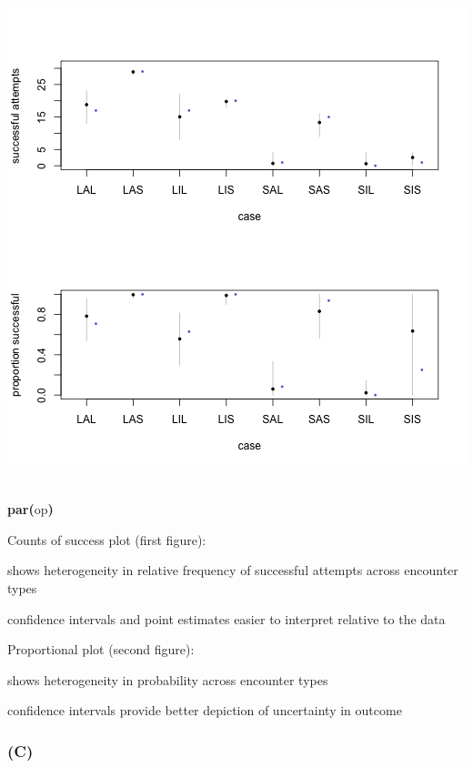 \documentclass{article}
\makeatletter
\newcommand{\hlfunctioncall}[1]{\textcolor[rgb]{.5,0,.33}{\textbf{#1}}}%
\newcommand{\hlkeyword}[1]{\textbf{#1}}%
\newcommand{\hlsymbol}[1]{#1}%
\newcommand{\hlstd}[1]{\textcolor[rgb]{0,0,0}{#1}}%
\newenvironment{kframe}{%
 \def\FrameCommand##1{\hskip\@totalleftmargin \hskip-\fboxsep
 \colorbox{shadecolor}{##1}\hskip-\fboxsep
     \hskip-\linewidth \hskip-\@totalleftmargin \hskip\columnwidth}%
 \MakeFramed {\advance\hsize-\width
   \@totalleftmargin\z@ \linewidth\hsize
   \@setminipage}}%
 {\par\unskip\endMakeFramed}
\newenvironment{knitrout}{}{} %
\makeatother
\begin{document}
\begin{knitrout}
{\begin{kframe}
\begin{flushleft}
\normalfont
\end{flushleft}
\includegraphics{pirate-plot-b1} \begin{flushleft}
\ttfamily\noindent
\hspace*{\fill}\\
\hlstd{}\hlfunctioncall{par}\hlkeyword{(}\hlsymbol{op}\hlkeyword{)}\mbox{}
\normalfont
\end{flushleft}
\end{kframe}}
\end{knitrout}


Counts of success plot (first figure):

shows heterogeneity in relative frequency of successful attempts across encounter types

confidence intervals and point estimates easier to interpret relative to the data

Proportional plot (second figure): 

shows heterogeneity in probability across encounter types

confidence intervals provide better depiction of uncertainty in outcome



\subsubsection*{(C)}
\end{document}

